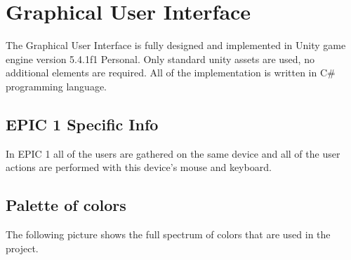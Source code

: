 \section{Graphical User Interface}
\noindent The Graphical User Interface is fully designed and implemented in Unity game engine version 5.4.1f1 Personal. Only standard unity assets are used, no additional elements are required. All of the implementation is written in C\# programming language.

\subsection{EPIC 1 Specific Info}
\noindent In EPIC 1 all of the users are gathered on the same device and all of the user actions are performed with this device's mouse and keyboard.

\subsection{Palette of colors}
\noindent The following picture shows the full spectrum of colors that are used in the project.

